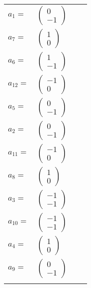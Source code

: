 \documentclass[1p]{elsarticle_modified}
\theoremstyle{definition}
\begin{document}
\begin{tabular}{m{7pt} m{180pt} m{7pt} m{180pt} }
\flushright $a_{1}=$&$\begin{pmatrix}0\\-1\end{pmatrix}$ \\
\flushright $a_{7}=$&$\begin{pmatrix}1\\0\end{pmatrix}$ \\
\flushright $a_{6}=$&$\begin{pmatrix}1\\-1\end{pmatrix}$ \\
\flushright $a_{12}=$&$\begin{pmatrix}-1\\0\end{pmatrix}$ \\
\flushright $a_{5}=$&$\begin{pmatrix}0\\-1\end{pmatrix}$ \\
\flushright $a_{2}=$&$\begin{pmatrix}0\\-1\end{pmatrix}$ \\
\flushright $a_{11}=$&$\begin{pmatrix}-1\\0\end{pmatrix}$ \\
\flushright $a_{8}=$&$\begin{pmatrix}1\\0\end{pmatrix}$ \\
\flushright $a_{3}=$&$\begin{pmatrix}-1\\-1\end{pmatrix}$ \\
\flushright $a_{10}=$&$\begin{pmatrix}-1\\-1\end{pmatrix}$ \\
\flushright $a_{4}=$&$\begin{pmatrix}1\\0\end{pmatrix}$ \\
\flushright $a_{9}=$&$\begin{pmatrix}0\\-1\end{pmatrix}$\\&\end{tabular}
\end{document}
